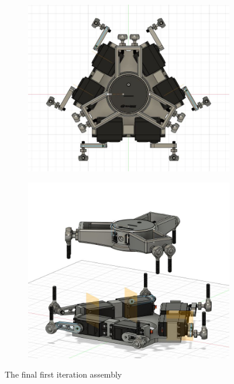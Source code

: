 \documentclass[a4paper, 10pt]{article}
\begin{document}
		\begin{figure}[h]
			\centering
			\begin{subfigure}[h]{0.34\textwidth}
				\centering
				\includegraphics[width=\textwidth]{Photos/assembly_top_down}
			\end{subfigure}
			\hfill
			\begin{subfigure}[h]{0.65\textwidth}
				\centering
				\includegraphics[width=\textwidth]{Photos/complete_assembly}
			\end{subfigure}
			\centering
			\caption{The final first iteration assembly}
			\label{final_assembly}
		\end{figure}
 		
\end{document}
